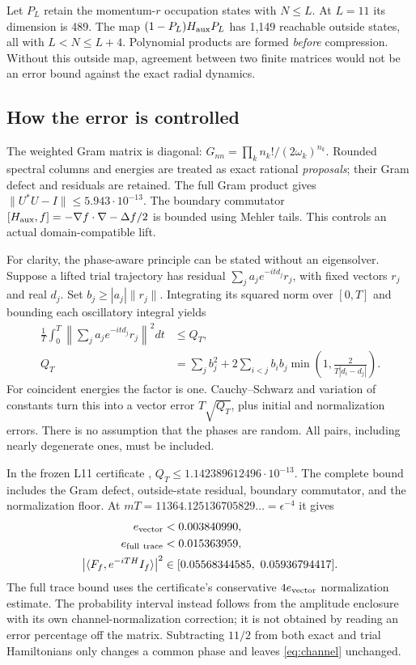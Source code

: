 \documentclass[11pt]{article}
\begin{document}
Let $P_L$ retain the momentum-$r$ occupation states with $N\le L$.
At $L=11$ its dimension is 489. The map
$(1-P_L)H_{\rm aux}P_L$ has 1,149 reachable outside states, all with
$L<N\le L+4$. Polynomial products are formed \emph{before} compression.
Without this outside map, agreement between two finite matrices would
not be an error bound against the exact radial dynamics.

\subsection{How the error is controlled}
The weighted Gram matrix is diagonal:
$G_{nn}=\prod_k n_k!/(2\omega_k)^{n_k}$. Rounded spectral columns and
energies are treated as exact rational \emph{proposals}; their Gram
defect and residuals are retained. The full Gram product gives
$\|U^*U-I\|\le5.943\cdot10^{-13}$.
The boundary commutator
$[H_{\rm aux},f]=-\nabla f\cdot\nabla-\Delta f/2$ is bounded using
Mehler tails. This controls an actual domain-compatible lift.

For clarity, the phase-aware principle can be stated without an
eigensolver. Suppose a lifted trial trajectory has residual
$\sum_j a_j e^{-itd_j}r_j$, with fixed vectors $r_j$ and real $d_j$.
Set $b_j\ge |a_j|\|r_j\|$. Integrating its squared norm over $[0,T]$
and bounding each oscillatory integral yields
\begin{align}
 \frac1T\int_0^T\left\|\sum_j a_je^{-itd_j}r_j\right\|^2dt
 &\le Q_T,\\
 Q_T&=\sum_jb_j^2+
 2\sum_{i<j}b_ib_j\min\left(1,\frac{2}{T|d_i-d_j|}\right).
 \label{eq:phase}
\end{align}
For coincident energies the factor is one. Cauchy--Schwarz and
variation of constants turn this into a vector error $T\sqrt{Q_T}$,
plus initial and normalization errors. There is no assumption that
the phases are random. All pairs, including nearly degenerate ones,
must be included.

In the frozen L11 certificate \cite{L11},
$Q_T\le1.142389612496\cdot10^{-13}$. The complete bound includes
the Gram defect, outside-state residual, boundary commutator, and the
normalization floor. At
$mT=11364.125136705829\ldots=\epsilon^{-4}$ it gives
\begin{align}
 e_{\rm vector}&<0.003840990,\\
 e_{\rm full\ trace}&<0.015363959,\\
 \left|\langle F_f,e^{-iTH}I_f\rangle\right|^2
 &\in[0.05568344585,\ 0.05936794417].
 \label{eq:channel}
\end{align}
The full trace bound uses the certificate's conservative $4e_{\rm vector}$
normalization estimate. The probability interval instead follows from
the amplitude enclosure with its own channel-normalization correction;
it is not obtained by reading an error percentage off the matrix.
Subtracting $11/2$ from both exact and trial Hamiltonians only changes a
common phase and leaves \eqref{eq:channel} unchanged.
\end{document}
